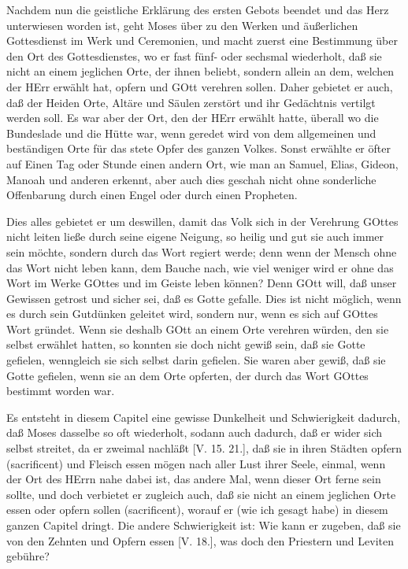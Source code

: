 Nachdem nun die geistliche Erklärung des ersten Gebots beendet und das Herz unterwiesen worden ist, geht Moses über zu den Werken und äußerlichen Gottesdienst im Werk und Ceremonien, und macht zuerst eine Bestimmung über den Ort des Gottesdienstes, wo er fast fünf- oder sechsmal wiederholt, daß sie nicht an einem jeglichen Orte, der ihnen beliebt, sondern allein an dem, welchen der HErr erwählt hat, opfern und GOtt verehren sollen. Daher gebietet er auch, daß der Heiden Orte, Altäre und Säulen zerstört und ihr Gedächtnis vertilgt werden soll. Es war aber der Ort, den der HErr erwählt hatte, überall wo die Bundeslade und die Hütte war, wenn geredet wird von dem allgemeinen und beständigen Orte für das stete Opfer des ganzen Volkes. Sonst erwählte er öfter auf Einen Tag oder Stunde einen andern Ort, wie man an Samuel, Elias, Gideon, Manoah und anderen erkennt, aber auch dies geschah nicht ohne sonderliche Offenbarung durch einen Engel oder durch einen Propheten.

Dies alles gebietet er um deswillen, damit das Volk sich in der Verehrung GOttes nicht leiten ließe durch seine eigene Neigung, so heilig und gut sie auch immer sein möchte, sondern durch das Wort regiert werde; denn wenn der Mensch ohne das Wort nicht leben kann, dem Bauche nach, wie viel weniger wird er ohne das Wort im Werke GOttes und im Geiste leben können? Denn GOtt will, daß unser Gewissen getrost und sicher sei, daß es Gotte gefalle. Dies ist nicht möglich, wenn es durch sein Gutdünken geleitet wird, sondern nur, wenn es sich auf GOttes Wort gründet. Wenn sie deshalb GOtt an einem Orte verehren würden, den sie selbst erwählet hatten, so konnten sie doch nicht gewiß sein, daß sie Gotte gefielen, wenngleich sie sich selbst darin gefielen. Sie waren aber gewiß, daß sie Gotte gefielen, wenn sie an dem Orte opferten, der durch das Wort GOttes bestimmt worden war.

Es entsteht in diesem Capitel eine gewisse Dunkelheit und Schwierigkeit dadurch, daß Moses dasselbe so oft wiederholt, sodann auch dadurch, daß er wider sich selbst streitet, da er zweimal nachläßt [V. 15. 21.], daß sie in ihren Städten opfern (sacrificent) und Fleisch essen mögen nach aller Lust ihrer Seele, einmal, wenn der Ort des HErrn nahe dabei ist, das andere Mal, wenn dieser Ort ferne sein sollte, und doch verbietet er zugleich auch, daß sie nicht an einem jeglichen Orte essen oder opfern sollen (sacrificent), worauf er (wie ich gesagt habe) in diesem ganzen Capitel dringt. Die andere Schwierigkeit ist: Wie kann er zugeben, daß sie von den Zehnten und Opfern essen [V. 18.], was doch den Priestern und Leviten gebühre?

